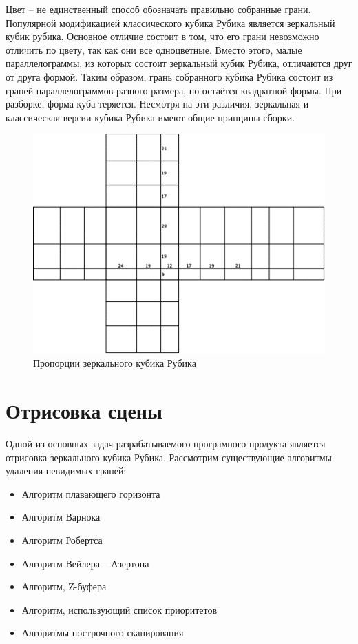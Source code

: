 \documentclass[a4paper, 14pt]{report}
\begin{document}
	Цвет – не единственный способ обозначать правильно собранные грани. Популярной модификацией классического кубика Рубика является зеркальный кубик рубика. Основное отличие состоит в том, что его грани невозможно отличить по цвету, так как они все одноцветные. Вместо этого, малые параллелограммы, из которых состоит зеркальный кубик Рубика, отличаются друг от друга формой. Таким образом, грань собранного кубика Рубика состоит из граней параллелограммов разного размера, но остаётся квадратной формы. При разборке, форма куба теряется. Несмотря на эти различия, зеркальная и классическая версии кубика Рубика имеют общие принципы сборки.
	
	\begin{figure}[ht]
		\centering
		\includegraphics{mirrored_cube_propotions.png}
		\caption{Пропорции зеркального кубика Рубика}
		\label{fig:mirrored_cube_proportions}
	\end{figure}

	\section{Отрисовка сцены}
	Одной из основных задач разрабатываемого програмного продукта является отрисовка зеркального кубика Рубика. Рассмотрим существующие алгоритмы удаления невидимых граней:
	\begin{itemize}
		\item Алгоритм плавающего горизонта
		\item Алгоритм Варнока
		\item Алгоритм Робертса
		\item Алгоритм Вейлера – Азертона
		\item Алгоритм, Z-буфера
		\item Алгоритм, использующий список приоритетов
		\item Алгоритмы построчного сканирования
	\end{itemize}
\end{document}
